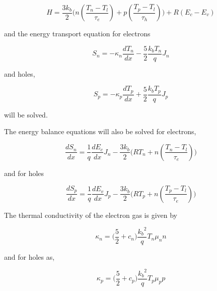 \begin{equation}
H=\frac{3 k_{b}}{2} \Bigg ( n (\frac{T_{n}-T_{l}}{\tau_{e}}) + p (\frac{T_{p}-T_{l}}{\tau_{h}})\Bigg) +R(E_{c}-E_{v})
\end{equation}

and the energy transport equation for electrons

\begin{equation}
S_n=-\kappa_n \frac{dT_{n}}{dx}-\frac{5}{2} \frac{k_{b}T_{n}}{q} J_{n}
\end{equation}

and holes,

\begin{equation}
S_p=-\kappa_p \frac{dT_{p}}{dx}+\frac{5}{2} \frac{k_{b}T_{p}}{q} J_{p}
\end{equation}

will be solved.

The energy balance equations will also be solved for electrons,

\begin{equation}
\frac{dS_{n}}{dx}=\frac{1}{q}\frac{dE_{c}}{dx} J_{n}-\frac{3 k_{b}}{2} \Bigg( R T_{n}+ n(\frac{T_{n}-T_{l}}{\tau_{e}}) \Bigg)
\end{equation}

and for holes

\begin{equation}
\frac{dS_{p}}{dx}=\frac{1}{q}\frac{dE_{v}}{dx} J_{p}-\frac{3 k_{b}}{2} \Bigg( R T_{p}+ n(\frac{T_{p}-T_{l}}{\tau_{e}}) \Bigg)
\end{equation}

The thermal conductivity of the electron gas is given by

\begin{equation}
\kappa_{n}=\Bigg ( \frac{5}{2} +c_n\Bigg) \frac{{k_{b}}^2}{q} T_{n} \mu_n n
\end{equation}

and for holes as,

\begin{equation}
\kappa_{p}=\Bigg ( \frac{5}{2} +c_p\Bigg) \frac{{k_{b}}^2}{q} T_{p} \mu_p p
\end{equation}



\newpage
